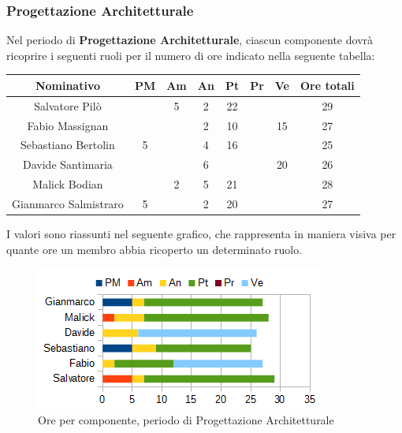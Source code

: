 		\subsubsection{Progettazione Architetturale}
		Nel periodo di \textbf{Progettazione Architetturale}, ciascun componente dovrà ricoprire i seguenti ruoli per il numero di ore indicato nella seguente tabella: \\
		\begin{table}[H]
		\centering
		\begin{tabular}{|c|c|c|c|c|c|c|c|}
			\hline
			\textbf{Nominativo}		& \textbf{PM}	& \textbf{Am}	& \textbf{An}	& \textbf{Pt}	& \textbf{Pr}	& \textbf{Ve}	& \textbf{Ore totali}     \\
			\hline
			Salvatore Pilò			& 		& 5 	& 2		& 22	&		&		& 29 \\
			Fabio Massignan			&		& 		& 2		& 10	&		& 15	& 27 \\
			Sebastiano Bertolin		& 5		& 		& 4		& 16	&		&		& 25 \\
			Davide Santimaria		&		& 		& 6		&		&		& 20	& 26 \\
			Malick Bodian			& 		& 2		& 5		& 21	&		& 		& 28 \\
			Gianmarco Salmistraro	& 5		& 		& 2		& 20	&		& 		& 27 \\
			\hline
		\end{tabular}
		\end{table}
		I valori sono riassunti nel seguente grafico, che rappresenta in maniera visiva per quante ore un membro abbia ricoperto un determinato ruolo. \\
		\begin{figure}[H]
			\centering
			\includegraphics[width=1\linewidth]{immagini/grafici/progettazione_architetturale-barra.png}
			\caption{Ore per componente, periodo di Progettazione Architetturale}
		\end{figure}

